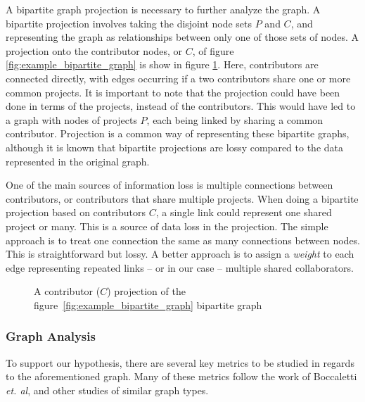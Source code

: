 \documentclass{proc}
\begin{document}
A bipartite graph projection is necessary to further analyze the graph. A bipartite projection involves taking the disjoint node sets $P$ and $C$, and representing the graph as relationships between only one of those sets of nodes. A projection onto the contributor nodes, or $C$, of figure \ref{fig:example_bipartite_graph} is show in figure \ref{fig:example_bipartite_projection_graph}. Here, contributors are connected directly, with edges occurring if a two contributors share one or more common projects. It is important to note that the projection could have been done in terms of the projects, instead of the contributors. This would have led to a graph with nodes of projects $P$, each being linked by sharing a common contributor. Projection is a common way of representing these bipartite graphs\cite{newman2001scientific}, although it is known that bipartite projections are lossy compared to the data represented in the original graph\cite{zhou2007bipartite}.

One of the main sources of information loss is multiple connections between contributors, or contributors that share multiple projects. When doing a bipartite projection based on contributors $C$, a single link could represent one shared project or many. This is a source of data loss in the projection. The simple approach is to treat one connection the same as many connections between nodes. This is straightforward but lossy\cite{zhou2007bipartite,grossman1995portion}. A better approach is to assign a \textit{weight} to each edge representing repeated links -- or in our case -- multiple shared collaborators\cite{zha2001bipartite,barrat2004architecture}. 

\begin{figure}
\centering
{}
\caption{A contributor ($C$) projection of the figure~\ref{fig:example_bipartite_graph} bipartite graph}
\label{fig:example_bipartite_projection_graph}
\end{figure}

\subsubsection{Graph Analysis}
To support our hypothesis, there are several key metrics to be studied in regards to the aforementioned graph. Many of these metrics follow the work of Boccaletti \textit{et. al}\cite{boccaletti2006complex}, and other studies of similar graph types\cite{latora2001efficient,adamic1999small}.
\end{document}

